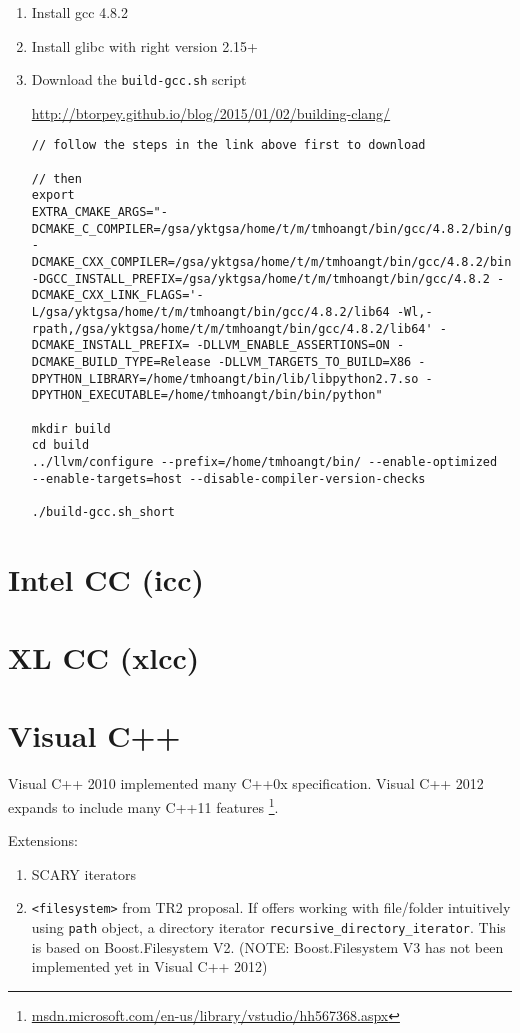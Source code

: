 \begin{enumerate}
  \item Install gcc 4.8.2
  \item Install glibc with right version 2.15+ 
  \item Download the \verb!build-gcc.sh! script

\url{http://btorpey.github.io/blog/2015/01/02/building-clang/}
  
\begin{verbatim}
// follow the steps in the link above first to download

// then
export
EXTRA_CMAKE_ARGS="-DCMAKE_C_COMPILER=/gsa/yktgsa/home/t/m/tmhoangt/bin/gcc/4.8.2/bin/gcc -DCMAKE_CXX_COMPILER=/gsa/yktgsa/home/t/m/tmhoangt/bin/gcc/4.8.2/bin/g++ -DGCC_INSTALL_PREFIX=/gsa/yktgsa/home/t/m/tmhoangt/bin/gcc/4.8.2 -DCMAKE_CXX_LINK_FLAGS='-L/gsa/yktgsa/home/t/m/tmhoangt/bin/gcc/4.8.2/lib64 -Wl,-rpath,/gsa/yktgsa/home/t/m/tmhoangt/bin/gcc/4.8.2/lib64' -DCMAKE_INSTALL_PREFIX= -DLLVM_ENABLE_ASSERTIONS=ON -DCMAKE_BUILD_TYPE=Release -DLLVM_TARGETS_TO_BUILD=X86 -DPYTHON_LIBRARY=/home/tmhoangt/bin/lib/libpython2.7.so -DPYTHON_EXECUTABLE=/home/tmhoangt/bin/bin/python"

mkdir build
cd build
../llvm/configure --prefix=/home/tmhoangt/bin/ --enable-optimized
--enable-targets=host --disable-compiler-version-checks

./build-gcc.sh_short
\end{verbatim}
\end{enumerate}



\section{Intel CC (icc)}
\label{sec:icc}
\label{sec:Intel-C-Compiler}

\section{XL CC (xlcc)}
\label{sec:xlcc}


\section{Visual C++}
\label{sec:VisualC++-Microsoft}
Visual C++ 2010 implemented many C++0x specification. Visual C++ 2012 expands
to include many C++11 features
\footnote{\url{msdn.microsoft.com/en-us/library/vstudio/hh567368.aspx}}.

Extensions:
\begin{enumerate}
  \item SCARY iterators
  \item \verb!<filesystem>! from TR2 proposal. If offers working with
  file/folder intuitively using \verb!path! object, a directory
  iterator \verb!recursive_directory_iterator!.
  This is based on Boost.Filesystem V2. (NOTE: Boost.Filesystem V3 has not been implemented yet
  in Visual C++ 2012)
\end{enumerate}


